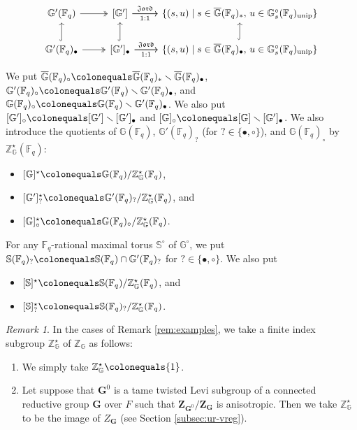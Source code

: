 \documentclass{amsart}
\newcommand{\unip}{\mathrm{unip}}
\newcommand{\Jord}{\mathfrak{Jord}}
\newcommand{\F}{\mathbb{F}}
\newcommand{\FF}{\mathbb{F}}
\newcommand{\bbS}{\mathbb{S}}
\newcommand{\bG}{\mathbb{G}}
\newcommand{\bbG}{\mathbb{G}}
\newcommand{\bfG}{\mathbf{G}}
\newcommand{\bbZ}{\mathbb{Z}}
\newcommand{\bfZ}{\mathbf{Z}}
\theoremstyle{plain}
\theoremstyle{definition}
\theoremstyle{remark}
\newtheorem{rem}[thm]{Remark}
\theoremstyle{theorem}
\begin{document}
\[
\begin{tikzcd}
\bbG'(\F_{q}) \ar[twoheadrightarrow]{r} & {[\bbG']} \ar{r}[above]{\Jord} \ar{r}[below]{1:1} & \{(s,u) \mid s \in \overline{\bbG}(\FF_q)_*, \, u \in \bbG_s^\circ(\FF_q)_{\unip}\} \\
\bbG'(\F_{q})_{\bullet} \ar[hookrightarrow]{u} \ar[twoheadrightarrow]{r} & {[\bbG']_\bullet} \ar[hookrightarrow]{u} \ar{r}[above]{\Jord} \ar{r}[below]{1:1} & \{(s,u) \mid s \in \overline{\bbG}(\FF_q)_\bullet, \, u \in \bbG_s^\circ(\FF_q)_{\unip}\} \ar[hookrightarrow]{u}
\end{tikzcd}
\]

We put $\overline{\bbG}(\F_{q})_{\circ}\colonequals \overline{\bbG}(\F_{q})_{\ast}\smallsetminus\overline{\bbG}(\F_{q})_{\bullet}$, $\bbG'(\F_{q})_{\circ}\colonequals \bbG'(\F_{q})\smallsetminus\bbG'(\F_{q})_{\bullet}$, and $\bbG(\F_{q})_{\circ}\colonequals \bbG(\F_{q})\smallsetminus\bbG'(\F_{q})_{\bullet}$.
We also put $[\bbG']_{\circ}\colonequals [\bbG']\smallsetminus[\bbG']_{\bullet}$ and $[\bbG]_{\circ}\colonequals [\bbG]\smallsetminus[\bbG']_{\bullet}$.
We also introduce the quotients of $\bbG(\F_{q})$, $\bbG'(\F_{q})_{?}$ (for $?\in\{\bullet,\circ\}$), and $\bbG(\F_{q})_{\circ}$  by $\bbZ^{\star}_{\bbG}(\F_{q})$:
\begin{itemize}
\item
$[\bbG]^{\star}\colonequals \bbG(\F_{q})/\bbZ^{\star}_{\bbG}(\F_{q})$,
\item 
$[\bbG']^{\star}_{?}\colonequals \bbG'(\F_{q})_{?}/\bbZ^{\star}_{\bbG}(\F_{q})$, and 
\item 
$[\bbG]^{\star}_{\circ}\colonequals \bbG(\F_{q})_{\circ}/\bbZ^{\star}_{\bbG}(\F_{q})$.
\end{itemize}

For any $\F_{q}$-rational maximal torus $\bbS^{\circ}$ of $\bbG^{\circ}$, we put $\bbS(\F_{q})_{?}\colonequals \bbS(\F_{q})\cap\bbG'(\F_{q})_{?}$ for $?\in\{\bullet,\circ\}$.
We also put
\begin{itemize}
\item
$[\bbS]^{\star}\colonequals \bbS(\F_{q})/\bbZ^{\star}_{\bbG}(\F_{q})$, and
\item
$[\bbS]^{\star}_{?}\colonequals \bbS(\F_{q})_{?}/\bbZ^{\star}_{\bG}(\F_{q})$.
\end{itemize}

\begin{rem}\label{rem:examples2}
In the cases of Remark \ref{rem:examples}, we take a finite index subgroup $\bbZ^{\star}_{\bbG}$ of $\bbZ_{\bbG}$ as follows:
\begin{enumerate}
\item
We simply take $\bbZ^{\star}_{\bbG}\colonequals \{1\}$.
\item
Let suppose that $\bfG^{0}$ is a tame twisted Levi subgroup of a connected reductive group $\bfG$ over $F$ such that $\bfZ_{\bfG^{0}}/\bfZ_{\bfG}$ is anisotropic.
Then we take $\bbZ^{\star}_{\bbG}$ to be the image of $Z_{\bfG}$ (see Section \ref{subsec:ur-vreg}).
\end{enumerate}
\end{rem}
\end{document}
